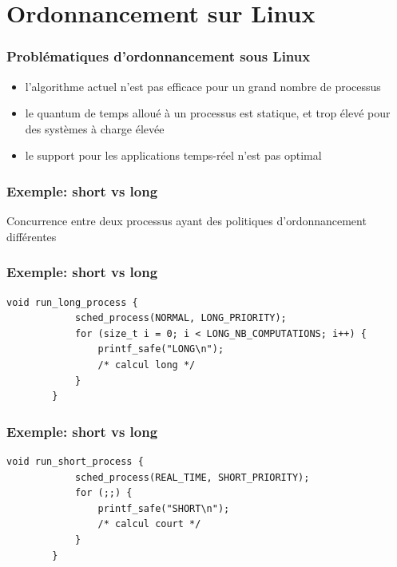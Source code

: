\documentclass{beamer}
\begin{document}
\section{Ordonnancement sur Linux}

\begin{frame}
    \frametitle{Problématiques d'ordonnancement sous Linux}

    \begin{itemize}
        \item<2-> l'algorithme actuel n'est pas efficace pour un grand nombre
            de processus
        \item<3-> le quantum de temps alloué à un processus est statique, et
            trop élevé pour des systèmes à charge élevée
        \item<4-> le support pour les applications temps-réel n'est pas optimal
    \end{itemize}
\end{frame}

\begin{frame}
    \frametitle{Exemple: short vs long}

    \begin{center}
        \huge
        Concurrence entre deux processus ayant des politiques d'ordonnancement
        différentes
    \end{center}
\end{frame}

\begin{frame}[fragile]
    \frametitle{Exemple: short vs long}

    \begin{lstlisting}[caption=processus long]
        void run_long_process {
            sched_process(NORMAL, LONG_PRIORITY);
            for (size_t i = 0; i < LONG_NB_COMPUTATIONS; i++) {
                printf_safe("LONG\n");
                /* calcul long */
            }
        }
    \end{lstlisting}
\end{frame}

\begin{frame}[fragile]
    \frametitle{Exemple: short vs long}

    \begin{lstlisting}[caption=processus court]
        void run_short_process {
            sched_process(REAL_TIME, SHORT_PRIORITY);
            for (;;) {
                printf_safe("SHORT\n");
                /* calcul court */
            }
        }
    \end{lstlisting}
\end{frame}
\end{document}
